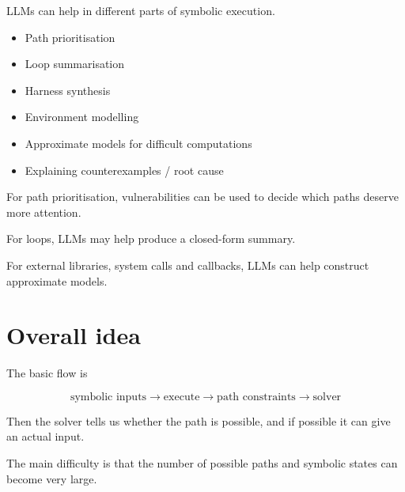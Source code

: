 \documentclass[11pt]{book}
\begin{document}
LLMs can help in different parts of symbolic execution.

\begin{itemize}
    \item Path prioritisation
    \item Loop summarisation
    \item Harness synthesis
    \item Environment modelling
    \item Approximate models for difficult computations
    \item Explaining counterexamples / root cause
\end{itemize}

For path prioritisation, vulnerabilities can be used
to decide which paths deserve more attention.

For loops, LLMs may help produce a closed-form summary.

For external libraries, system calls and callbacks,
LLMs can help construct approximate models.

\section{Overall idea}

The basic flow is

\[
\text{symbolic inputs}
\rightarrow
\text{execute}
\rightarrow
\text{path constraints}
\rightarrow
\text{solver}
\]

Then the solver tells us whether the path is possible,
and if possible it can give an actual input.

\begin{ppkey}
The main difficulty is that the number of possible paths
and symbolic states can become very large.
\end{ppkey}
\end{document}
